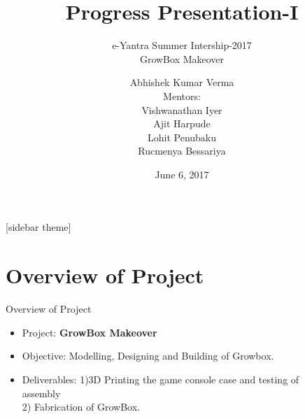 \documentclass[10pt, a4paper]{beamer}
\begin{document}
	\title{Progress Presentation-I}
	\subtitle{e-Yantra Summer Intership-2017 \\GrowBox Makeover}
	\author{\small Abhishek Kumar Verma\\\vspace{5mm} 
	Mentors:\\ Vishwanathan Iyer\\Ajit Harpude\\Lohit Penubaku\\Rucmenya Bessariya}
	\date{June 6, 2017}
	\frame{\titlepage}
 
[sidebar theme]
\section{Overview of Project}
\begin{frame}{Overview of Project}
 
	\begin{itemize}
		\item Project: \textbf {GrowBox Makeover}
		\item Objective: Modelling, Designing and Building of Growbox. 
		\item Deliverables: 1)3D Printing the game console case and testing of\\ \noindent\hspace{65}assembly\\\noindent\hspace{55} 2) Fabrication of GrowBox.\\
	\end{itemize}
\end{frame}
 
\end{document}
